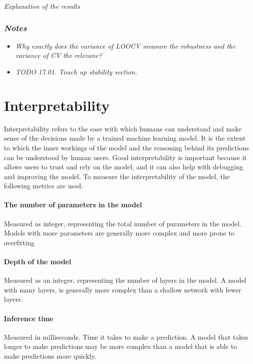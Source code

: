 \textit{Explanation of the results}

\subsubsection*{\textit{Notes}}

\begin{itemize}
    \item \textit{Why exactly does the variance of LOOCV measure the robustness and the variance
    of CV the relevane?}
    \item \textit{TODO 17.01. Touch up stability section.}
\end{itemize}

\section{Interpretability}\label{sec:interpretability}
Interpretability refers to the ease with which humans can understand and make sense of the
decisions made by a trained machine learning model. \cite[p.
16]{siebert_constructionqualitymodel_} It is the extent to which the inner workings of the model
and the reasoning behind its predictions can be understood by human users. Good interpretability
is important because it allows users to trust and rely on the model, and it can also help with
debugging and improving the model.
To measure the interpretability of the model, the following metrics are used:

\paragraph*{The number of parameters in the model}
Measured as integer, representing the total number of parameters in the model.
Models with more parameters are generally more complex and more prone to overfitting

\paragraph*{Depth of the model}
Measured as an integer, representing the number of layers in the model.
A model with many layers, is generally more complex than a shallow network with fewer layers.

\paragraph*{Inference time}
Measured in milliseconds. Time it takes to make a prediction.
A model that takes longer to make predictions may be more complex than a model that is able to
make predictions more quickly.

